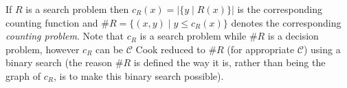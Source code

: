 \documentclass[12pt]{article}
\begin{document}
If $R$ is a search problem then $c_R(x)=|\{y\mid R(x)\}|$ is the corresponding counting function and $\#R=\{(x,y)\mid y\leq c_R(x)\}$ denotes the corresponding \emph{counting problem}.  Note that $c_R$ is a search problem while $\#R$ is a decision problem, however $c_R$ can be $\mathcal{C}$ Cook reduced to $\#R$ (for appropriate $\mathcal{C}$) using a binary search (the reason $\#R$ is defined the way it is, rather than being the graph of $c_R$, is to make this binary search possible).
\end{document}
